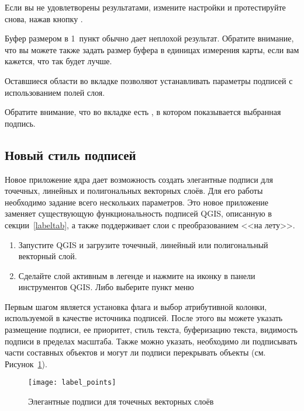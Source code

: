 Если вы не удовлетворены результатами, измените настройки и протестируйте
снова, нажав кнопку .

Буфер размером в 1~пункт обычно дает неплохой результат. Обратите внимание,
что вы можете также задать размер буфера в единицах измерения карты, если
вам кажется, что так будет лучше.

Оставшиеся области во вкладке  позволяют устанавливать
параметры подписей с использованием полей слоя.

Обратите внимание, что во вкладке  есть ,
в котором показывается выбранная подпись.

\subsection{Новый стиль подписей}\label{newlabel}

Новое приложение ядра \qg {} дает возможность
создать элегантные подписи для точечных, линейных и полигональных векторных
слоёв. Для его работы необходимо задание всего нескольких параметров.
Это новое приложение заменяет существующую функциональность подписей QGIS,
описанную в секции~\ref{labeltab}, а также поддерживает слои с преобразованием
<<на лету>>.


\begin{enumerate}
  \item Запустите QGIS и загрузите точечный, линейный или полигональный
  векторный слой.
  \item Сделайте слой активным в легенде и нажмите на иконку
   в панели инструментов QGIS. Либо выберите
пункт меню  \arrow {}
\end{enumerate}


Первым шагом является установка флага 
и выбор атрибутивной колонки, используемой в качестве источника подписей.
После этого вы можете указать размещение подписи, ее приоритет, стиль
текста, буферизацию текста, видимость подписи в пределах масштаба. Также
можно указать, необходимо ли подписывать части составных объектов и могут
ли подписи перекрывать объекты (см. Рисунок~\ref{fig:pointlabel}).

\begin{figure}[ht]
\centering
   \texttt{[image: label\_points]}
   \caption{Элегантные подписи для точечных векторных слоёв \wincaption}\label{fig:pointlabel}
\end{figure}


